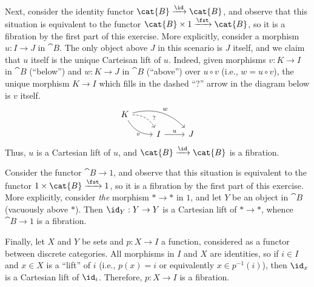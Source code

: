 \begin{solution}
Next, consider the identity functor \(\cat{B} \xrightarrow{\id} \cat{B}\), and observe that this situation is equivalent to the functor \(\cat{B} \times 1 \xrightarrow{\fst} \cat{B}\), so it is a fibration by the first part of this exercise.
More explicitly, consider a morphism \(u : I \to J\) in \(\cat{B}\).
The only object above \(J\) in this scenario is \(J\) itself, and we claim that \(u\) itself is the unique Carteisan lift of \(u\).
Indeed, given morphisms \(v : K \to I\) in \(\cat{B}\) (``below'') and \(w : K \to J\) in \(\cat{B}\) (``above'') over \(u \circ v\) (i.e., \(w = u \circ v\)), the unique morphism \(K \to I\) which fills in the dashed ``?'' arrow in the diagram below is \(v\) itself.
\begin{equation*}
\begin{tikzcd}[row sep=small]
K \arrow[rd, bend left, dashed, near end, "?"] \arrow[rd, bend right, "v"{below}] \arrow[rrd, bend left, "w"] \\
& I \arrow[r, "u"] & J
\end{tikzcd}
\end{equation*}
Thus, \(u\) is a Cartesian lift of \(u\), and \(\cat{B} \xrightarrow{\id} \cat{B}\) is a fibration.

Consider the functor \(\cat{B} \to 1\), and observe that this situation is equivalent to the functor \(1 \times \cat{B} \xrightarrow{\fst} 1\), so it is a fibration by the first part of this exercise.
More explicitly, consider \emph{the} morphism \(* \to *\) in \(1\), and let \(Y\) be an object in \(\cat{B}\) (vacuously above \(*\)).
Then \(\id_Y : Y \to Y\) is a Cartesian lift of \(* \to *\), whence \(\cat{B} \to 1\) is a fibration.

Finally, let \(X\) and \(Y\) be sets and \(p : X \to I\) a function, considered as a functor between discrete categories.
All morphisms in \(I\) and \(X\) are identities, so if \(i \in I\) and \(x \in X\) is a ``lift'' of \(i\) (i.e., \(p(x) = i\) or equivalently \(x \in p^{-1}(i)\)), then \(\id_x\) is a Cartesian lift of \(\id_i\).
Therefore, \(p : X \to I\) is a fibration.
\end{solution}